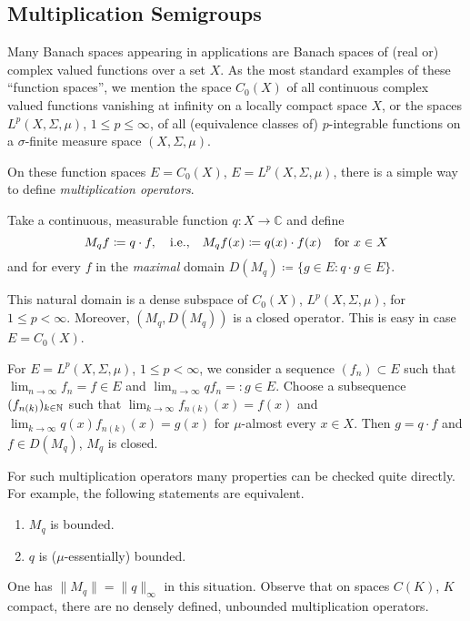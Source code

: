 \subsection{Multiplication Semigroups}\label{subsec:a1-2.3}%
Many Banach spaces appearing in applications are Banach spaces of (real or) complex valued functions over a set $X$.
As the most standard examples of these \enquote{function spaces}, we mention the space $C_{0}(X)$ of all continuous complex valued functions vanishing at infinity on a locally compact space $X$, or the spaces $L^{p}(X,\Sigma,\mu)$, $1 \leq p \leq \infty$, of all (equivalence classes of) $p$-integrable functions on a $\sigma$-finite measure space $(X,\Sigma,\mu)$.

On these function spaces $E = C_{0}(X)$, \resp $E = L^{p}(X,\Sigma,\mu)$, there is a simple way to define \emph{multiplication operators}.

Take a continuous, \resp measurable function $q \colon X \to \mathbb{C}$ and define
\[
    M_{q}f \coloneqq q \cdot f, \quad \text{i.e.,} \quad M_{q}f(x) 
    \coloneqq q(x) 	\cdot f(x) \quad \text{for } x \in X 
\]
and for every $f$ in the \emph{maximal} domain $D(M_{q}) \coloneqq \{g \in E \colon q \cdot g \in E\}$.

This natural domain is a dense subspace of $C_{0}(X)$, \resp $L^{p}(X,\Sigma,\mu)$, for $1 \leq p < \infty$.
Moreover, $(M_{q},D(M_{q}))$ is a closed operator.
This is easy in case $E = C_{0}(X)$.

For $E = L^{p}(X,\Sigma,\mu)$, $1 \leq p < \infty$, we consider a sequence $(f_{n}) \subset E$ such that $\lim_{n \to \infty} f_{n} = f \in E$ and $\lim_{n \to \infty} qf_{n} = \colon g \in E$.
Choose a subsequence $(f_{n(k)})_{k \in \mathbb{N}}$ such that $\lim_{k \to \infty} f_{n(k)}(x) = f(x)$ and $\lim_{k \to \infty} q(x)f_{n(k)}(x) = g(x)$ for $\mu$-almost every $x \in X$.
Then $g = q \cdot f$ and $f \in D(M_{q})$, \ie $M_{q}$ is closed.

For such multiplication operators many properties can be checked quite directly.
For example, the following statements are equivalent.
\begin{enumerate}[\upshape (a)]
\item 
$M_{q}$ is bounded.

\item 
$q$ is ($\mu$-essentially) bounded.
\end{enumerate}
One has $\|M_{q}\| = \|q\|_{\infty}$ in this situation.
Observe that on spaces $C(K)$, $K$ compact, there are no densely defined, unbounded multiplication operators.

